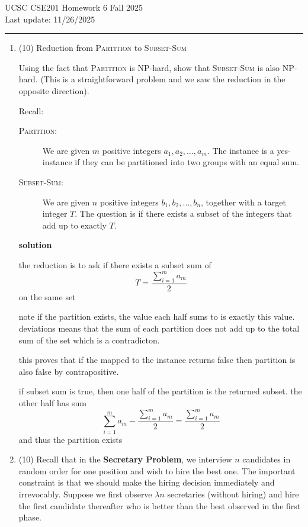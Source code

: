 \documentclass[letterpaper,12pt]{article}
\begin{document}
\noindent
 UCSC CSE201 Homework 6 \hfill Fall 2025 \\
Last update: 11/26/2025 \\
 \rule{\textwidth}{0.5pt}




\begin{enumerate}


\item (10) {Reduction from \textsc{Partition} to \textsc{Subset-Sum}}

Using the fact that \textsc{Partition} is NP-hard, show that \textsc{Subset-Sum} is also NP-hard. (This is a straightforward problem and we saw the reduction in the opposite direction). 

Recall:
\begin{description}
    \item[\textsc{Partition}:] We are given $m$ positive integers $a_1, a_2, \ldots, a_m$. The instance is a yes-instance if they can be partitioned into two groups with an equal sum.
    \item[\textsc{Subset-Sum}:] We are given $n$ positive integers $b_1, b_2, \ldots, b_n$, together with a target integer $T$. The question is if there exists a subset of the integers that add up to exactly $T$.
\end{description}

\textbf{solution}

the reduction is to ask if there exists a subset sum of 
\begin{equation}
    T=\frac{\sum_{i=1}^{m}a_m}{2}
\end{equation} on the same set 

note if the partition exists, the value each half sums to is exactly this value. deviations means that the sum of each partition does not add up to the total sum of the set which is a contradicton.

this proves that if the mapped to the instance returns false then partition is also false by contrapositive. 

if subset sum is true, then one half of the partition is the returned subset. the other half has sum \begin{equation}
    \sum_{i=1}^{m}a_m - \frac{\sum_{i=1}^{m}a_m}{2} = \frac{\sum_{i=1}^{m}a_m}{2}
\end{equation} and thus the partition exists




\item (10) Recall that in the \textbf{Secretary Problem}, we interview $n$ candidates in random order for one position and wish to hire the best one. The important constraint is that we should make the hiring decision immediately and irrevocably. Suppose we first observe $\lambda n$ secretaries (without hiring) and hire the first candidate thereafter who is better than the best observed in the first phase.




\end{enumerate}
\end{document}

